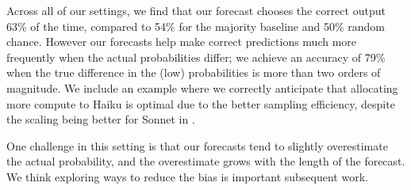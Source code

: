 Across all of our settings, we find that our forecast chooses the correct output 63\% of the time, compared to 54\% for the majority baseline and 50\% random chance.
However our forecasts help make correct predictions much more frequently when the actual probabilities differ; we achieve an accuracy of 79\% when the true difference in the (low) probabilities is more than two orders of magnitude. 
We include an example where we correctly anticipate that allocating more compute to Haiku is optimal due to the better sampling efficiency, despite the scaling being better for Sonnet in . 

One challenge in this setting is that our forecasts tend to slightly overestimate the actual probability, and the overestimate grows with the length of the forecast. 
We think exploring ways to reduce the bias is important subsequent work. 